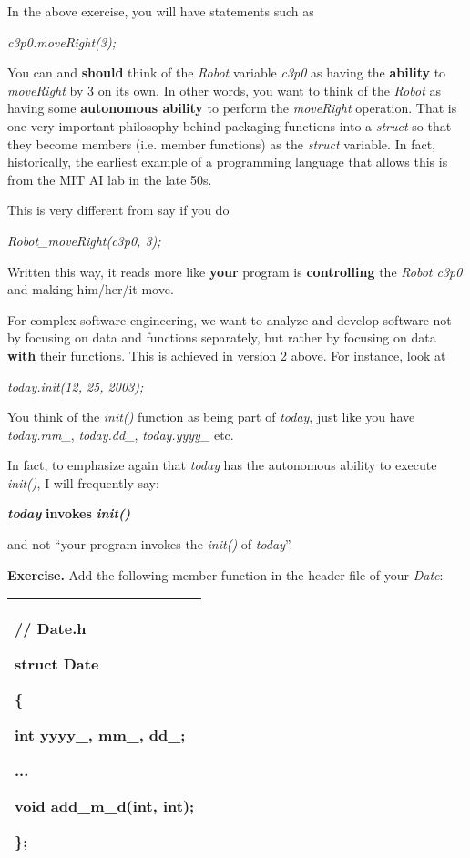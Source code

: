 \documentclass[
]{article}
\begin{document}
In the above exercise, you will have statements such as

\emph{c3p0.moveRight(3);}

You can and \textbf{should }think of the \emph{Robot} variable
\emph{c3p0} as having the \textbf{ability} to \emph{moveRight} by 3 on
its own. In other words, you want to think of the \emph{Robot} as having
some \textbf{autonomous ability} to perform the \emph{moveRight}
operation. That is one very important philosophy behind packaging
functions into a \emph{struct} so that they become members (i.e. member
functions) as the \emph{struct} variable. In fact, historically, the
earliest example of a programming language that allows this is from the
MIT AI lab in the late 50s.

This is very different from say if you do

\emph{Robot\_moveRight(c3p0, 3);}

Written this way, it reads more like \textbf{your} program is
\textbf{controlling} the \emph{Robot c3p0 }and making him/her/it move.

For complex software engineering, we want to analyze and develop
software not by focusing on data and functions separately, but rather by
focusing on data \textbf{with} their functions. This is achieved in
version 2 above. For instance, look at

\emph{today.init(12, 25, 2003);}

You think of the\emph{ init() }function as being part of \emph{today},
just like you have \emph{today.mm\_}, \emph{today.dd\_},
\emph{today.yyyy\_ }etc.

In fact, to emphasize again that \emph{today} has the autonomous ability
to execute \emph{init()}, I will frequently say:

\emph{\textbf{today }}\textbf{invokes }\emph{\textbf{init()}}

and not ``your program invokes the \emph{init()} of \emph{today}''.

\textbf{Exercise. }Add the following member function in the header file
of your \emph{Date}:

\begin{longtable}[]{@{}l@{}}
\toprule
\endhead
\begin{minipage}[t]{0.97\columnwidth}\raggedright
// Date.h

struct Date

\{

int yyyy\_, mm\_, dd\_;

...

void add\_m\_d(int, int);

\};\strut
\end{minipage}\tabularnewline
\bottomrule
\end{longtable}
\end{document}
